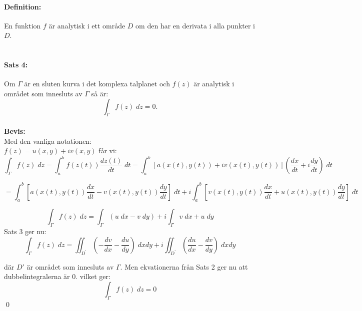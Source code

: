 \paragraph{Definition:} En funktion $f$ är analytisk i ett område $D$ om den har en derivata i alla punkter i $D$.\\
\\
\paragraph{Sats 4:} Om $\Gamma$ är en sluten kurva i det komplexa talplanet och $f(z)$ är analytisk i området som innesluts av $\Gamma$ så är:
$$\int_{\Gamma} f(z) \; dz = 0.$$
\\
{\bf Bevis:}\\
Med den vanliga notationen:\\
$f(z) = u(x, y) + iv(x, y)$ får vi:
$$\int_{\Gamma} f(z) \; dz = \int_a^b f(z(t)) \frac {dz(t)} {dt} \; dt = \int_a^b [a(x(t), y(t)) + iv(x(t), y(t)) ]
\left ( \frac {dx} {dt} + i \frac {dy} {dt} \right ) \; dt$$

$$= \int_a^b \left [a(x(t), y(t)) \frac {dx} {dt} - v(x(t), y(t)) \frac {dy} {dt} \right ] \; dt + i \int_a^b \left [v(x(t), y(t)) \frac {dx} {dt} + 
u(x(t), y (t)) \frac {dy} {dt} \right ] \; dt$$

$$\int_{\Gamma} f(z) \; dz = \int_\Gamma (u \; dx - v \; dy) + i \int_\Gamma v \; dx + u \; dy$$
Sats 3 ger nu:
$$\int_{\Gamma} f(z) \; dz = \iint_{D^\prime} \left ( - \frac {dv} {dx} - \frac {du} {dy} \right ) \; dxdy +
i \iint_{D^\prime} \left ( \frac {du} {dx} - \frac {dv} {dy} \right ) \; dxdy$$

där $D'$ är området som innesluts av $\Gamma$. Men ekvationerna från Sats 2 ger nu att
dubbelintegralerna är $0$. vilket ger:
$$\int_\Gamma f(z) \; dz = 0$$
\hfill \qed

